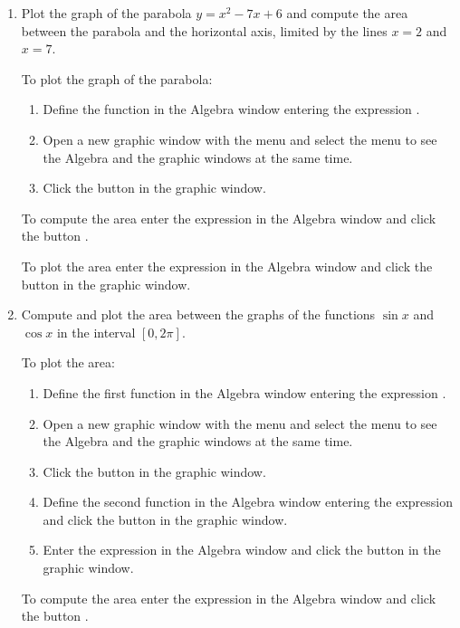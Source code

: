\begin{enumerate}[leftmargin=*]
\item Plot the graph of the parabola $y=x^2-7x+6$ and compute the area between the parabola and the horizontal axis, limited by the lines $x=2$ and $x=7$.
\begin{indication}
To plot the graph of the parabola:
\begin{enumerate}
\item Define the function in the Algebra window entering the expression .
\item Open a new graphic window with the menu  and select the menu  to see the Algebra and the graphic windows at the same time.
\item Click the button  in the graphic window.
\end{enumerate}
To compute the area enter the expression  in the Algebra window and click the button .

To plot the area enter the expression  in the Algebra window and click the button  in the graphic window.
\end{indication}


\item Compute and plot the area between the graphs of the functions $\sin x$ and $\cos x$ in the interval $[0,2\pi]$.
\begin{indication}
To plot the area:
\begin{enumerate}
\item Define the first function in the Algebra window entering the expression .
\item Open a new graphic window with the menu  and select the menu  to see the Algebra and the graphic windows at the same time.
\item Click the button  in the graphic window.
\item Define the second function in the Algebra window entering the expression  and click the button  in the graphic window.
\item Enter the expression  in the Algebra window and click the button  in the graphic window.
\end{enumerate}
To compute the area enter the expression  in the Algebra window and click the button .
\end{indication}




\end{enumerate}
